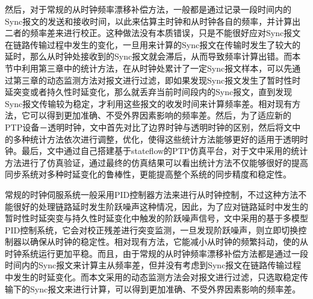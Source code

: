 然后，对于常规的从时钟频率漂移补偿方法，一般都是通过记录一段时间内的Sync报文的发送和接收时间，以此来估算主时钟和从时钟各自的频率，并计算出二者的频率差来进行校正。这种做法没有本质错误，只是不能很好应对Sync报文在链路传输过程中发生的变化，一旦用来计算的Sync报文在传输时发生了较大的延时，那么从时钟处接收到的Sync报文就会滞后，从而导致频率计算出错。而本节中利用第三章中的统计方法，在从时钟处累计了一定Sync报文样本，可以先通过第三章的动态监测方法对报文进行过滤，即如果发现Sync报文发生了暂时性时延突变或者持久性时延变化，那么就丢弃当前时间段内的Sync报文，直到发现Sync报文传输较为稳定，才利用这些报文的收发时间来计算频率差。相对现有方法，它可以得到更加准确、不受外界因素影响的频率差。然后，为了适应新的PTP设备－透明时钟，文中首先对比了边界时钟与透明时钟的区别，然后将文中的多种统计方法依次进行调整，优化，使得这些统计方法能够更好的适用于透明时钟。最后，文中通过自己搭建基于stateflow的PTP仿真平台，对于文中采用的统计方法进行了仿真验证，通过最终的仿真结果可以看出统计方法不仅能够很好的提高同步系统对多种时延变化的鲁棒性，更能提高整个系统的同步精度和稳定性。

常规的时钟伺服系统一般采用PID控制器方法来进行从时钟控制，不过这种方法不能很好的处理链路延时发生阶跃噪声这种情况，因此，为了应对链路延时中发生的暂时性时延突变与持久性时延变化中触发的阶跃噪声信号，文中采用的基于多模型PID控制系统，它会对校正残差进行突变监测，一旦发现阶跃噪声，则立即切换控制器以确保从时钟的稳定性。相对现有方法，它能减小从时钟的频繁抖动，使的从时钟系统运行更加平稳。而且，由于常规的从时钟频率漂移补偿方法都是通过一段时间内的Sync报文来计算主从频率差，但并没有考虑到Sync报文在链路传输过程中发生的时延变化。而本文采用的动态监测方法会对报文进行过滤，只选取稳定传输下的Sync报文来进行计算，可以得到更加准确、不受外界因素影响的频率差。
